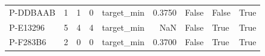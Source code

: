 \begin{tabular}{lrrrlrlll}
   P-DDBAAB &               1 &                          1 &                                 0 &       target\_min &                    0.3750 &                            False &                  False &                             True \\
   P-E13296 &               5 &                          4 &                                 4 &       target\_min &                       NaN &                            False &                   True &                             True \\
   P-F283B6 &               2 &                          0 &                                 0 &       target\_min &                    0.3700 &                            False &                   True &                             True \\
\bottomrule
\end{tabular}

